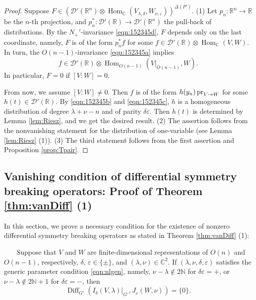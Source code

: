 \begin{proof}
Suppose 
$
   F 
   \in 
   ({\mathcal{D}}'({\mathbb{R}}^n) \otimes {\operatorname{Hom}}_{\mathbb{C}}(V_{\lambda,\delta}, W_{\nu,\varepsilon}))^{\Delta(P')}$.  
\newline
(1)\enspace
Let $p_n \colon {\mathbb{R}}^n \to {\mathbb{R}}$ be
 the $n$-th projection, 
 and 
$
   p_n^{\ast} \colon {\mathcal{D}}'({\mathbb{R}}) \to {\mathcal{D}}'({\mathbb{R}}^n)
$
 the pull-back of distributions.  
By the $N_+'$-invariance
 \eqref{eqn:152345d}, 
 $F$ depends only on the last coordinate, 
 namely, 
 $F$ is of the form $p_n^{\ast}f$
 for some $f \in {\mathcal{D}}'({\mathbb{R}}) \otimes \operatorname{Hom}_{\mathbb{C}}(V,W)$.  
In turn,
 the $O(n-1)$-invariance \eqref{eqn:152345a} implies
\[
   f \in {\mathcal{D}}'({\mathbb{R}}) \otimes \operatorname{Hom}_{O(n-1)}(V|_{O(n-1)},W).  
\]
In particular, 
 $F=0$
 if $[V:W]=0$.  

{}From now,
 we assume $[V:W] \ne 0$.  
Then $f$ is of the form $h(y_n) \operatorname{pr}_{{V}\to{W}}$
 for some $h(t) \in {\mathcal{D}}'({\mathbb{R}})$.  
By \eqref{eqn:152345b} and \eqref{eqn:152345c}, 
 $h$ is a homogeneous distribution
 of degree $\lambda+\nu-n$
 and of parity $\delta \varepsilon$.  
Then $h(t)$ is determined by Lemma \ref{lem:Riesz}, 
 and we get the desired result.  
\newline
(2)\enspace
The assertion follows from the nonvanishing statement
 for the distribution
 of one-variable
 (see Lemma \ref{lem:Riesz} (1)).  
\newline
(3)\enspace
The third statement follows from 
 the first assertion and Proposition \ref{prop:Tpair}.  
\end{proof}


\subsection{Vanishing condition of differential symmetry breaking operators:
Proof of Theorem \ref{thm:vanDiff} (1)}
\label{subsec:vanDiff}

In this section, we prove a necessary condition 
 for the existence of nonzero differential symmetry breaking operators
 as stated in Theorem \ref{thm:vanDiff} (1):
\begin{theorem}
\label{thm:vanishDiff}
~~~\newline
Suppose that $V$ and $W$ are finite-dimensional representations
 of $O(n)$ and $O(n-1)$, 
respectively,
 $\delta$, $\varepsilon \in \{\pm\}$, 
 and $(\lambda,\nu) \in {\mathbb{C}}^2$.  
If $(\lambda, \nu, \delta, \varepsilon)$
 satisfies the 
generic parameter condition
 \eqref{eqn:nlgen}, 
 namely, 
 $\nu - \lambda \not \in 2{\mathbb{N}}$
 for $\delta \varepsilon=+$, 
 or $\nu - \lambda \not \in 2{\mathbb{N}}+1$
 for $\delta \varepsilon=-$, 
then 
\[
  {\operatorname{Diff}}_{G'}
  (I_{\delta}(V,\lambda)|_{G'},J_{\varepsilon}(W,\nu))=\{0\}.  
\]
\end{theorem}

